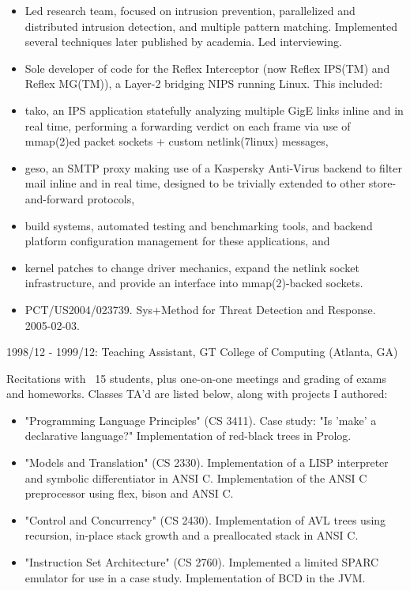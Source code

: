 \documentclass{article}
\begin{document}
\begin{itemize}
\item Led research team, focused on intrusion prevention, parallelized and
  distributed intrusion detection, and multiple pattern matching. Implemented
  several techniques later published by academia. Led interviewing.
\item Sole developer of code for the Reflex Interceptor (now Reflex IPS(TM) and
  Reflex MG(TM)), a Layer-2 bridging NIPS running Linux. This included:
    \item tako, an IPS application statefully analyzing multiple GigE links inline
      and in real time, performing a forwarding verdict on each frame via use
      of mmap(2)ed packet sockets + custom netlink(7linux) messages,
    \item geso, an SMTP proxy making use of a Kaspersky Anti-Virus backend to
      filter mail inline and in real time, designed to be trivially extended
      to other store-and-forward protocols,
    \item build systems, automated testing and benchmarking tools, and backend
      platform configuration management for these applications, and
    \item kernel patches to change driver mechanics, expand the netlink socket
      infrastructure, and provide an interface into mmap(2)-backed sockets.
\item PCT/US2004/023739. Sys+Method for Threat Detection and Response. 2005-02-03.
\end{itemize}

1998/12 - 1999/12: Teaching Assistant, GT College of Computing (Atlanta, GA)

Recitations with ~15 students, plus one-on-one meetings and grading of exams
and homeworks. Classes TA'd are listed below, along with projects I authored:

\begin{itemize}
\item "Programming Language Principles" (CS 3411). Case study: "Is 'make' a
   declarative language?" Implementation of red-black trees in Prolog.
\item "Models and Translation" (CS 2330). Implementation of a LISP interpreter
   and symbolic differentiator in ANSI C. Implementation of the ANSI C
   preprocessor using flex, bison and ANSI C.
\item "Control and Concurrency" (CS 2430). Implementation of AVL trees using
   recursion, in-place stack growth and a preallocated stack in ANSI C.
\item "Instruction Set Architecture" (CS 2760). Implemented a limited SPARC
   emulator for use in a case study. Implementation of BCD in the JVM.
\end{itemize}
\end{document}
